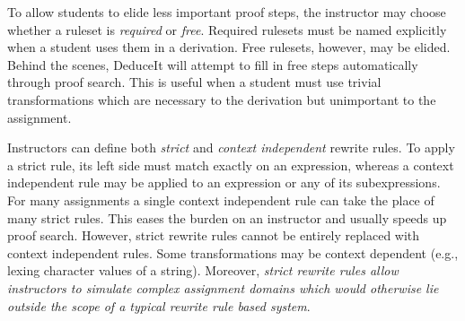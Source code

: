 \documentclass{sigchi}
\begin{document}
To allow students to elide less important proof steps, the instructor may choose whether a ruleset is \emph{required} or \emph{free}. Required rulesets must be named explicitly when a student uses them in a derivation. Free rulesets, however, may be elided. Behind the scenes, DeduceIt will attempt to fill in free steps automatically through proof search. This is useful when a student must use trivial transformations which are necessary to the derivation but unimportant to the assignment. 


Instructors can define both \emph{strict} and \emph{context independent} rewrite rules. To apply a strict rule, its left side must match exactly on an expression, whereas a context independent rule may be applied to an expression or any of its subexpressions. 
For many assignments a single context independent rule can take the place of many strict rules. This eases the burden on an instructor and usually speeds up proof search. However, strict rewrite rules cannot be entirely replaced with context independent rules. Some transformations may be context dependent (e.g., lexing character values of a string). Moreover, \textit{strict rewrite rules allow instructors to simulate complex assignment domains which would otherwise lie outside the scope of a typical rewrite rule based system}. 
\end{document}
